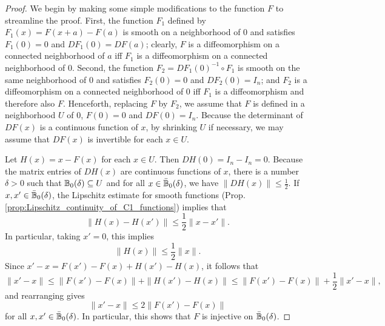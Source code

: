 \documentclass[11pt,a4paper]{article}
\begin{document}
\begin{proof}
We begin by making some simple modifications to the function $F$ to streamline the proof. First, the function $F_1$ defined by $F_1(x) = F(x+a)-F(a)$ is smooth on a neighborhood of $0$ and satisfies $F_1(0) = 0$ and $DF_1(0) = DF(a)$; clearly, $F$ is a diffeomorphism on a connected neighborhood of $a$ iff $F_1$ is a diffeomorphism on a connected neighborhood of $0$. Second, the function $F_2 = DF_1(0)^{-1}\circ F_1$ is smooth on the same neighborhood of $0$ and satisfies $F_2(0) = 0$ and $DF_2(0) = I_n$; and $F_2$ is a diffeomorphism on a connected neighborhood of $0$ iff $F_1$ is a diffeomorphism and therefore also $F$. Henceforth, replacing $F$ by $F_2$, we assume that $F$ is defined in a neighborhood $U$ of $0$, $F(0) = 0$ and $DF(0) = I_n$. Because the determinant of $DF(x)$ is a continuous function of $x$, by shrinking $U$ if necessary, we may assume that $DF(x)$ is invertible for each $x\in U$.

Let $H(x) = x - F(x)$ for each $x\in U$. Then $DH(0) = I_n - I_n = 0$. Because the matrix entries of $DH(x)$ are continuous functions of $x$, there is a number $\delta>0$ such that $\mathbb{B}_0(\delta)\subseteq U$ and for all $x\in \bar{\mathbb{B}}_0(\delta)$, we have $\|DH(x)\|\le \frac{1}{2}$. If $x,x'\in \bar{\mathbb{B}}_0(\delta)$, the Lipschitz estimate for smooth functions (Prop. \ref{prop:Lipschitz_continuity_of_C1_functions}) implies that 
\begin{equation}\label{eqn:Lipschitz_continuity}
    \|H(x)-H(x')\|\le \frac{1}{2}\|x-x'\|.
\end{equation}
In particular, taking $x' = 0$, this implies
\begin{equation}\label{eqn:bound_on_H}
    \|H(x)\|\le \frac{1}{2}\|x\|.
\end{equation}
Since $x'-x = F(x')-F(x) + H(x')-H(x)$, it follows that 
\begin{equation*}
\|x'-x\|\le \|F(x')-F(x)\| + \|H(x')-H(x)\| \le \|F(x')-F(x)\| + \frac{1}{2}\|x'-x\|,
\end{equation*}
and rearranging gives
\begin{equation}\label{eqn:relation_between_F_and_x}
    \|x'-x\|\le 2\|F(x')-F(x)\|
\end{equation}
for all $x,x'\in \bar{\mathbb{B}}_0(\delta)$. In particular, this shows that $F$ is injective on $\bar{\mathbb{B}}_0(\delta)$.


\end{proof}
\end{document}
